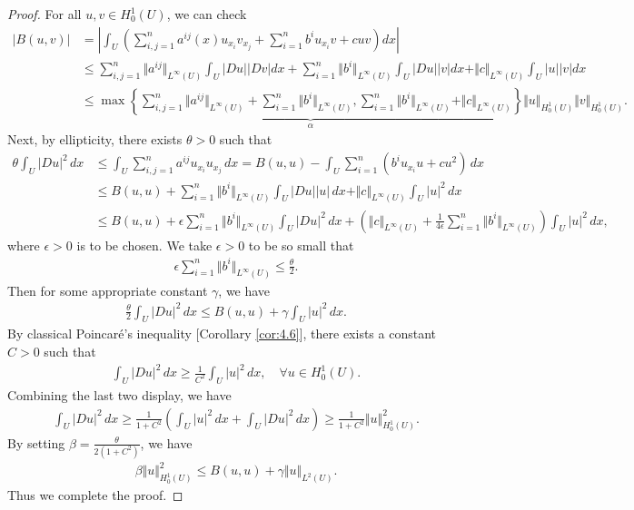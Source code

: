 \documentclass{article}
\numberwithin{equation}{section}
\theoremstyle{plain}
\theoremstyle{definition}
\begin{document}
\begin{proof}
For all $u,v\in H_0^1(U)$, we can check
\begin{align*}
	\vert B(u,v)\vert&=\left\vert\int_U\left(\sum_{i,j=1}^n a^{ij}(x)u_{x_i}v_{x_j}+\sum_{i=1}^n b^i u_{x_i}v+cuv\right)dx\right\vert\\
	&\leq\sum_{i,j=1}^n\Vert a^{ij}\Vert_{L^\infty(U)}\int_U\vert Du\vert\left\vert Dv\right\vert dx+\sum_{i=1}^n\Vert b^i\Vert_{L^\infty(U)}\int_U\vert Du\vert\left\vert v\right\vert dx+\Vert c\Vert_{L^\infty(U)}\int_U\vert u\vert\left\vert v\right\vert dx\\
	&\leq\underbrace{\max\left\{\sum_{i,j=1}^n\Vert a^{ij}\Vert_{L^\infty(U)}+\sum_{i=1}^n\Vert b^i\Vert_{L^\infty(U)},\sum_{i=1}^n\Vert b^i\Vert_{L^\infty(U)}+\Vert c\Vert_{L^\infty(U)}\right\}}_\alpha \Vert u\Vert_{H_0^1(U)}\Vert v\Vert_{H_0^1(U)}.
\end{align*}
Next, by ellipticity, there exists $\theta>0$ such that
\begin{align*}
	\theta\int_U\vert Du\vert^2\,dx&\leq\int_U\sum_{i,j=1}^n a^{ij} u_{x_i}u_{x_j}\,dx=B(u,u)-\int_U\sum_{i=1}^n\left(b^i u_{x_i}u+cu^2\right)\,dx\\
	&\leq B(u,u)+\sum_{i=1}^n\Vert b^i\Vert_{L^\infty(U)}\int_U\vert Du\vert\left\vert u\right\vert\,dx+\Vert c\Vert_{L^\infty(U)}\int_U \vert u\vert^2\,dx\\
	&\leq B(u,u)+ \epsilon\sum_{i=1}^n\Vert b^i\Vert_{L^\infty(U)}\int_U\vert Du\vert^2\,dx+\left(\Vert c\Vert_{L^\infty(U)}+\frac{1}{4\epsilon}\sum_{i=1}^n\Vert b^i\Vert_{L^\infty(U)}\right)\int_U \vert u\vert^2\,dx,
\end{align*}
where $\epsilon>0$ is to be chosen. We take $\epsilon>0$ to be so small that
\begin{align*}
	\epsilon\sum_{i=1}^n\Vert b^i\Vert_{L^\infty(U)}\leq\frac{\theta}{2}.
\end{align*}
Then for some appropriate constant $\gamma$, we have
\begin{align*}
	\frac{\theta}{2}\int_U\vert Du\vert^2\,dx\leq B(u,u)+\gamma\int_U\vert u\vert^2\,dx.
\end{align*}
By classical Poincaré's inequality [Corollary \ref{cor:4.6}], there exists a constant $C>0$ such that
\begin{align*}
	\int_U\vert Du\vert^2\,dx\geq\frac{1}{C^2}\int_U\vert u\vert^2\,dx,\quad\forall u\in H_0^1(U).
\end{align*}
Combining the last two display, we have
\begin{align*}
	\int_U\vert Du\vert^2\,dx\geq\frac{1}{1+C^2}\left(\int_U\vert u\vert^2\,dx+\int_U\vert Du\vert^2\,dx\right)\geq\frac{1}{1+C^2}\Vert u\Vert_{H_0^1(U)}^2.
\end{align*}
By setting $\beta=\frac{\theta}{2(1+C^2)}$, we have
\begin{align*}
	\beta\Vert u\Vert_{H_0^1(U)}^2\leq B(u,u)+\gamma\Vert u\Vert_{L^2(U)}.
\end{align*}
Thus we complete the proof.
\end{proof}
\end{document}
